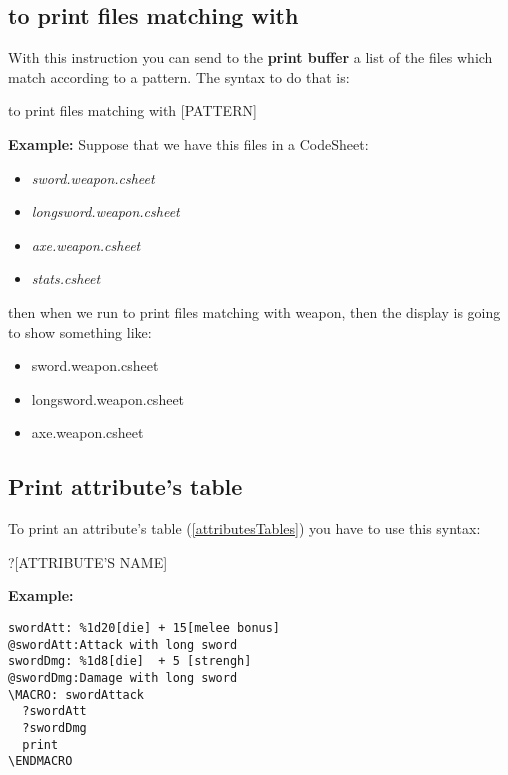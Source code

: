\documentclass[11pt,a4paper,openright,oneside]{book}
\newenvironment{ex}
{
  \setlength{\parindent}{0cm}
  \large \textbf{Example:} \normalsize 
}
{}
\begin{document}
\subsection{\textsf{to print files matching with}}

With this instruction you can send to the \textbf{print buffer} a list of the files which match according to a pattern. The syntax to do that is:
\begin{center} \textsf{to print files matching with \textsc{\scriptsize[PATTERN]}} \end{center}

\begin{ex} Suppose that we have this files in a CodeSheet:
  \begin{itemize} 
    \item \textit{sword.weapon.csheet}
    \item \textit{longsword.weapon.csheet}
    \item \textit{axe.weapon.csheet}
    \item \textit{stats.csheet}
  \end{itemize}
  then when we run  \textsf{to print files matching with weapon}, then the display is going to show something like:
  \begin{itemize}
    \item \textsf{sword.weapon.csheet}
    \item \textsf{longsword.weapon.csheet}
    \item \textsf{axe.weapon.csheet}
  \end{itemize}
\end{ex}

\subsection{Print attribute's table} \label{tableMacroInstruction}
To print an attribute's table (\ref{attributesTables}) you have to use this syntax:
\begin{center} \textsf{?\textsc{\scriptsize[ATTRIBUTE'S NAME]}} \end{center}

\begin{ex}
  \begin{lstlisting}
swordAtt: %1d20[die] + 15[melee bonus]
@swordAtt:Attack with long sword
swordDmg: %1d8[die]  + 5 [strengh]
@swordDmg:Damage with long sword
\MACRO: swordAttack
  ?swordAtt
  ?swordDmg
  print
\ENDMACRO
  \end{lstlisting}
\end{ex}
\end{document}
